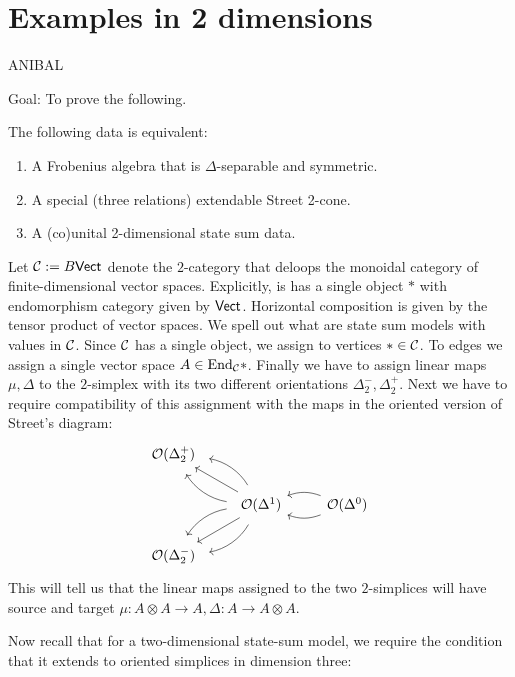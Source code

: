 
\section{Examples in 2 dimensions}

ANIBAL

Goal: To prove the following.
\begin{theorem}
	The following data is equivalent:
	\begin{enumerate}
		\item A Frobenius algebra that is $\Delta$-separable and symmetric.
		\item A special (three relations) extendable Street 2-cone.
		\item A (co)unital 2-dimensional state sum data.
	\end{enumerate}
\end{theorem}


Let $\mathcal{C} := B\mathsf{Vect}$ denote the $2$-category that deloops the monoidal category of finite-dimensional vector spaces.
Explicitly, is has a single object $*$ with endomorphism category given by $\mathsf{Vect}$.
Horizontal composition is given by the tensor product of vector spaces.
We spell out what are state sum models with values in $\mathcal{C}$.
Since $\mathcal{C}$ has a single object, we assign to vertices $* \in \mathcal{C}$.
To edges we assign a single vector space $A \in \mathrm{End}_{\mathcal{C}} *$.
Finally we have to assign linear maps $\mu, \Delta$ to the $2$-simplex with its two different orientations $\Delta^-_2, \Delta^+_2$.
Next we have to require compatibility of this assignment with the maps in the oriented version of Street's diagram:
\[
\begin{tikzcd}
\oriental(\Delta^+_2)    & &
\\
& \oriental(\Delta^1) \ar[lu, bend right = 25, shorten <=0.2cm, shorten >=0.2cm] \ar[lu, bend left = 25, shorten <=0.2cm, shorten >=0.2cm] \ar[lu] \ar[ld, bend right = 25, shorten <=0.2cm, shorten >=0.2cm] \ar[ld, bend left = 25, shorten <=0.2cm, shorten >=0.2cm] \ar[ld] & \oriental(\Delta^0) \ar[l, bend left=20] \ar[l, bend right=20]
\\
\oriental(\Delta^-_2) & &
\end{tikzcd}
\]
This will tell us that the linear maps assigned to the two $2$-simplices will have source and target $\mu: A \otimes A \to A, \Delta: A \to A \otimes A$.

Now recall that for a two-dimensional state-sum model, we require the condition that it extends to oriented simplices in dimension three:

